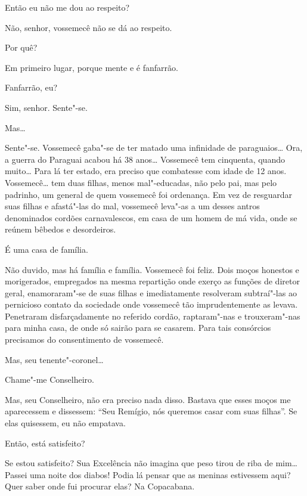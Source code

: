  Então eu não me dou ao respeito?

 Não, senhor, vossemecê não se dá ao respeito.

 Por quê?

 Em primeiro lugar, porque mente e é fanfarrão.

  Fanfarrão, eu?

 Sim, senhor. Sente"-se.

 Mas\ldots

 Sente"-se.   Vossemecê gaba"-se de
ter matado uma infinidade de paraguaios\ldots{} Ora, a guerra do Paraguai acabou há
38 anos\ldots{} Vossemecê tem cinquenta, quando muito\ldots{} Para lá ter
estado, era preciso que combatesse com idade de 12 anos.   Vossemecê\ldots{} tem duas filhas, menos mal"-educadas, não pelo
pai, mas pelo padrinho, um general de quem vossemecê foi ordenança. Em vez de
resguardar suas filhas e afastá"-las do mal, vossemecê leva"-as a um desses antros
denominados cordões carnavalescos, em casa de um homem de má vida, onde se
reúnem bêbedos e desordeiros.

 É uma casa de família.

 Não duvido, mas há família e família.   Vossemecê foi feliz. Dois moços honestos e morigerados,
empregados na mesma repartição onde exerço as funções de diretor geral,
enamoraram"-se de suas filhas e imediatamente resolveram subtraí"-las ao
pernicioso contato da sociedade onde vossemecê tão imprudentemente as levava.
Penetraram disfarçadamente no referido cordão, raptaram"-nas e trouxeram"-nas para
minha casa, de onde só sairão para se casarem. Para tais consórcios precisamos
do consentimento de vossemecê.

  Mas, seu
tenente"-coronel\ldots

 Chame"-me Conselheiro.

 Mas, seu Conselheiro, não era preciso nada disso. Bastava que
esses moços me aparecessem e dissessem: ``Seu Remígio, nós queremos
casar com suas filhas''. Se elas quisessem, eu não empatava.

 Então, está satisfeito?

 Se estou satisfeito? Sua Excelência não imagina que peso
tirou de riba de mim\ldots{} Passei uma noite dos diabos! Podia lá pensar que as
meninas estivessem aqui? Quer saber onde fui procurar elas? Na Copacabana.

